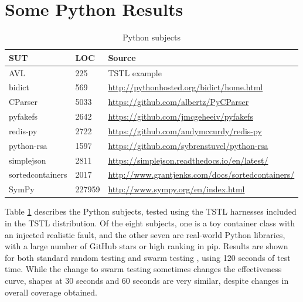 \section{Some Python Results}


\begin{table}
\centering
\caption{Python subjects}
\label{tab:subjects}
{\scriptsize
\begin{tabular}{l|ll}
SUT & LOC & Source \\
\hline
AVL & 225 & TSTL example \cite{avltree} \\
bidict & 569 & \url{http://pythonhosted.org/bidict/home.html} \\
CParser & 5033 & \url{https://github.com/albertz/PyCParser}\\
pyfakefs & 2642 & \url{https://github.com/jmcgeheeiv/pyfakefs} \\
redis-py & 2722 & \url{https://github.com/andymccurdy/redis-py}\\
python-rsa & 1597 & \url{https://github.com/sybrenstuvel/python-rsa} \\
simplejson & 2811 & \url{https://simplejson.readthedocs.io/en/latest/} \\
sortedcontainers & 2017 & \url{http://www.grantjenks.com/docs/sortedcontainers/} \\
SymPy & 227959 & \url{http://www.sympy.org/en/index.html} \\
\end{tabular}
}
\end{table}

Table \ref{tab:subjects} describes the Python subjects, tested using
the TSTL \cite{tstlsttt,NFM15} harnesses included in the TSTL
distribution.  Of the eight subjects, one is a toy container class
with an injected realistic fault, and the other seven are real-world
Python libraries, with a large number of GitHub stars or high
ranking in pip.  Results are shown for both standard random testing
and swarm testing \cite{ISSTA12}, using 120 seconds of test time.
While the change to swarm testing sometimes changes the effectiveness
curve, shapes at 30 seconds and 60 seconds are very similar, despite
changes in overall coverage obtained.

\newpage

